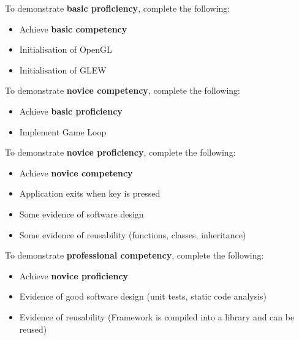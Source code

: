\documentclass{../../../fal_assignment}
\begin{document}
To demonstrate \textbf{basic proficiency}, complete the following:
\begin{itemize}
	\item Achieve \textbf{basic competency}
	\item Initialisation of OpenGL
	\item Initialisation of GLEW
\end{itemize}

To demonstrate \textbf{novice competency}, complete the following:
\begin{itemize}
	\item Achieve \textbf{basic proficiency}
	\item Implement Game Loop
\end{itemize}

To demonstrate \textbf{novice proficiency}, complete the following:
\begin{itemize}
	\item Achieve \textbf{novice competency}
	\item Application exits when key is pressed
	\item Some evidence of software design
	\item Some evidence of reusability (functions, classes, inheritance) 
\end{itemize}

To demonstrate \textbf{professional competency}, complete the following:
\begin{itemize}
	\item Achieve \textbf{novice proficiency}
	\item Evidence of good software design (unit tests, static code analysis)
	\item Evidence of reusability (Framework is compiled into a library and can be reused)
\end{itemize}
\end{document}

